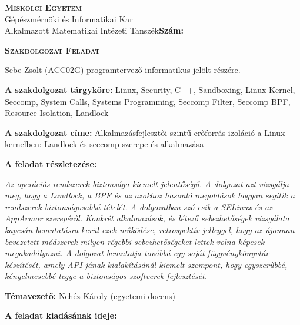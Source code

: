 \noindent
\textsc{\textbf{Miskolci Egyetem}}\\
Gépészmérnöki és Informatikai Kar\\
Alkalmazott Matematikai Intézeti Tanszék\hspace*{4cm}\hfil \textbf{Szám:}

\vspace{0.5cm}
\begin{center}
\large\textsc{\textbf{Szakdolgozat Feladat}}
\end{center}
\vspace{0.5cm}

Sebe Zsolt (ACC02G) programtervező informatikus jelölt részére.

\bigskip
\noindent\textbf{A szakdolgozat tárgyköre:} Linux, Security, C++, Sandboxing, Linux Kernel, Seccomp, System Calls, Systems Programming, Seccomp Filter, Seccomp BPF, Resource Isolation, Landlock

\bigskip
\noindent\textbf{A szakdolgozat címe:} Alkalmazásfejlesztői szintű erőforrás-izoláció a Linux kernelben: Landlock és seccomp szerepe és alkalmazása

\bigskip
\noindent\textbf{A feladat részletezése:}

\medskip

\emph{Az operációs rendszerek biztonsága kiemelt jelentőségű. A dolgozat azt vizsgálja meg, hogy a Landlock, a BPF és az azokhoz hasonló megoldások hogyan segítik a rendszerek biztonságosabbá tételét. A dolgozatban szó esik a SELinux és az AppArmor szerepéről. Konkrét alkalmazások, és létező sebezhetőségek vizsgálata kapcsán bemutatásra kerül ezek működése, retrospektív jelleggel, hogy az újonnan bevezetett módszerek milyen régebbi sebezhetőségeket lettek volna képesek megakadályozni. A dolgozat bemutatja továbbá egy saját függvénykönyvtár készítését, amely API-jának kialakításánál kiemelt szempont, hogy egyszerűbbé, kényelmesebbé tegye a biztonságos szoftverek fejlesztését.}



\vfill

\noindent\textbf{Témavezető:} Nehéz Károly (egyetemi docens)


\bigskip
\noindent\textbf{A feladat kiadásának ideje:}

